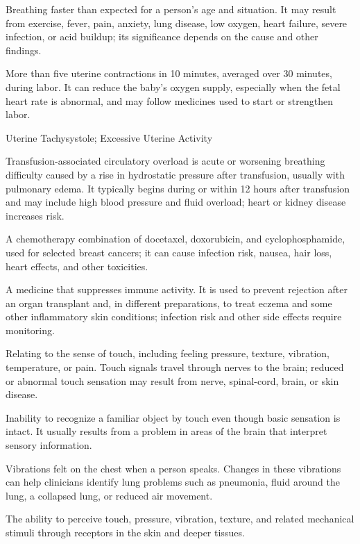  Breathing faster than expected for a person’s age and situation. It may result from exercise, fever, pain, anxiety, lung disease, low oxygen, heart failure, severe infection, or acid buildup; its significance depends on the cause and other findings.

 More than five uterine contractions in 10 minutes, averaged over 30 minutes, during labor. It can reduce the baby’s oxygen supply, especially when the fetal heart rate is abnormal, and may follow medicines used to start or strengthen labor.

\synonyms
Uterine Tachysystole; Excessive Uterine Activity

 Transfusion-associated circulatory overload is acute or worsening breathing difficulty caused by a rise in hydrostatic pressure after transfusion, usually with pulmonary edema. It typically begins during or within 12 hours after transfusion and may include high blood pressure and fluid overload; heart or kidney disease increases risk.

 A chemotherapy combination of docetaxel, doxorubicin, and cyclophosphamide, used for selected breast cancers; it can cause infection risk, nausea, hair loss, heart effects, and other toxicities.

 A medicine that suppresses immune activity. It is used to prevent rejection after an organ transplant and, in different preparations, to treat eczema and some other inflammatory skin conditions; infection risk and other side effects require monitoring.

 Relating to the sense of touch, including feeling pressure, texture, vibration, temperature, or pain. Touch signals travel through nerves to the brain; reduced or abnormal touch sensation may result from nerve, spinal-cord, brain, or skin disease.

 Inability to recognize a familiar object by touch even though basic sensation is intact. It usually results from a problem in areas of the brain that interpret sensory information.

 Vibrations felt on the chest when a person speaks. Changes in these vibrations can help clinicians identify lung problems such as pneumonia, fluid around the lung, a collapsed lung, or reduced air movement.

 The ability to perceive touch, pressure, vibration, texture, and related mechanical stimuli through receptors in the skin and deeper tissues.

